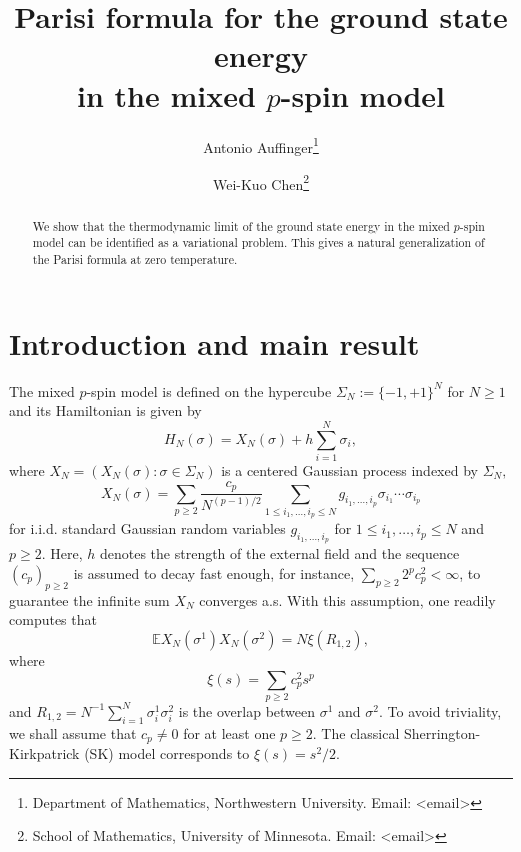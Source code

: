 \documentclass[12pt]{article}
\newcommand{\e}{\mathbb{E}}
\newenvironment{Proof of lemma}{\noindent{\bf Proof of Lemma}}{\hfill$\Box$\newline}
\newenvironment{Proof of theorem}{\noindent{\bf Proof of Theorem}}{\hfill{\footnotesize${\square}$}\newline}
\newenvironment{Proof of theorems}{\noindent{\bf Proof of Theorems}}{\hfill$\Box$\newline}
\newenvironment{Proof of proposition}{\noindent{\bf Proof of Proposition}}{\hfill$\Box$\newline}
\newenvironment{Proof of propositions}{\noindent{\bf Proof of Propositions}}{\hfill$\Box$\newline}
\newenvironment{Proof of exercise}{\noindent{\it Proof of Exercise:}}{\hfill$\Box$}
\begin{document}
	
	\nocite{*} 
	
	\title{Parisi formula for the ground state energy\\ in the mixed $p$-spin model}
	
	\author{
				Antonio Auffinger\thanks{Department of Mathematics, Northwestern University. Email: <email>}
				\and
				Wei-Kuo Chen\thanks{School of Mathematics, University of Minnesota. Email: <email>}
	}
	\maketitle
	
	\begin{abstract}
		
		We show that the thermodynamic limit of the ground state energy in the mixed $p$-spin model can be identified as a variational problem. This gives a natural generalization of the Parisi formula at zero temperature. 
		
	\end{abstract}

	
\section{Introduction and main result}

The mixed $p$-spin model is defined on the hypercube $\Sigma_N:=\{-1,+1\}^N$ for $N\geq 1$ and its Hamiltonian is given by
$$
H_N(\sigma)=X_N(\sigma)+h\sum_{i=1}^N\sigma_i,
$$
where $X_N=(X_N(\sigma):\sigma\in \Sigma_N)$ is a centered Gaussian process indexed by $\Sigma_N,$
$$
X_N(\sigma)=\sum_{p\geq 2}\frac{c_p}{N^{(p-1)/2}}\sum_{1\leq i_1,\ldots,i_p\leq N}g_{i_1,\ldots,i_p}\sigma_{i_1}\cdots\sigma_{i_p}
$$
for i.i.d. standard Gaussian random variables $g_{i_1,\ldots,i_p}$ for $1\leq i_1,\ldots,i_p\leq N$ and $p\geq 2.$ Here, $h$ denotes the strength of the external field and the sequence $(c_p)_{p\geq 2}$ is assumed to decay fast enough, for instance, $\sum_{p\geq 2}2^pc_p^2<\infty$, to guarantee the infinite sum $X_N$ converges a.s. With this assumption, one readily computes that
$$
\e X_{N}(\sigma^1)X_N(\sigma^2)=N\xi(R_{1,2}),
$$
where 
$$
\xi(s)=\sum_{p\geq 2}c_p^2s^p
$$
and $R_{1,2}=N^{-1}\sum_{i=1}^N\sigma_i^1\sigma_i^2$ is the overlap between $\sigma^1$ and $\sigma^2.$ To avoid triviality, we shall assume that $c_p\neq 0$ for at least one $p\geq 2.$ The classical Sherrington-Kirkpatrick (SK) model corresponds to $\xi(s)=s^2/2.$
\end{document}
